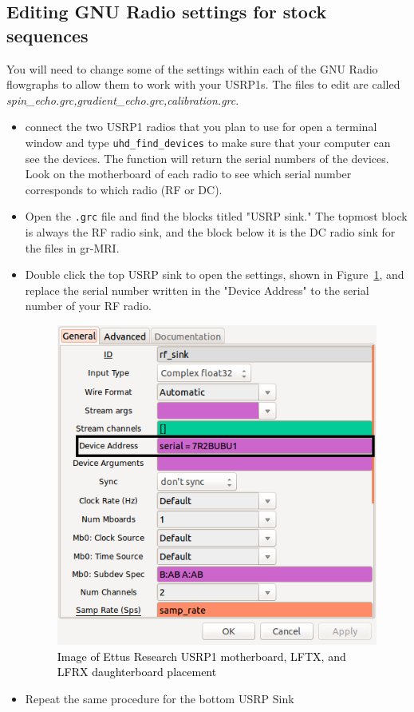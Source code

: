 \documentclass[11pt, oneside]{article}   	%
\begin{document}
\subsection{Editing GNU Radio settings for stock sequences}
\indent You will need to change some of the settings within each of the GNU Radio flowgraphs to allow them to work with your USRP1s.  The files to edit are called \textit{spin\_echo.grc,gradient\_echo.grc,calibration.grc}.
\begin{itemize}
	\item connect the two USRP1 radios that you plan to use for open a terminal window and type \texttt{uhd\_find\_devices} to make sure that your computer can see the devices.  The function will return the serial numbers of the devices.  Look on the motherboard of each radio to see which serial number corresponds to which radio (RF or DC).
	\item Open the \texttt{.grc} file and find the blocks titled "USRP sink." The topmost block is always the RF radio sink, and the block below it is the DC radio sink for the files in gr-MRI.
	\item Double click the top USRP sink to open the settings, shown in Figure~\ref{fig:usrpsink}, and replace the serial number written in the "Device Address" to the serial number of your RF radio.
	
	\begin{figure}[!ht]
	\begin{center}
	\includegraphics[width = .65\textwidth,trim=0 0 0 0,clip=false]{usrpsink_settings.png}
	\caption{\textcolor{black}{Image of Ettus Research USRP1 motherboard, LFTX, and LFRX daughterboard placement}}
	\label{fig:usrpsink}
	\end{center}
	\end{figure}
	
	\item Repeat the same procedure for the bottom USRP Sink
	
\end{itemize}
\end{document}
